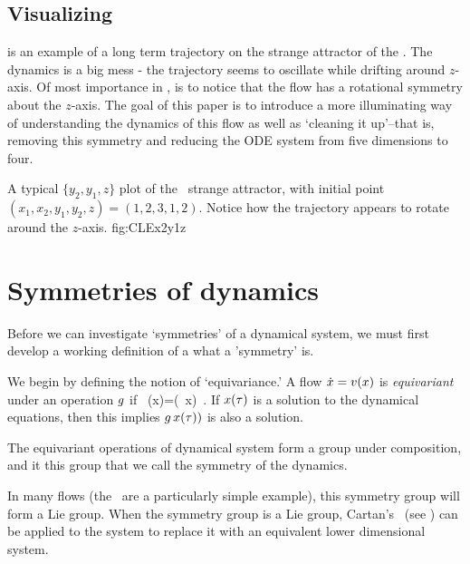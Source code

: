 {    \ifarticle
    \else

\subsection{Visualizing \cLf}

 is an example of a long term trajectory on the strange attractor of the \cLe. The dynamics is a big mess - the
trajectory seems to oscillate while drifting around $z$-axis.
Of most importance in , is to notice
that the flow has a rotational symmetry about the $z$-axis.
The goal of this paper is to introduce a more
illuminating way of understanding the dynamics of this flow
as well as `cleaning it up'--that is, removing this
symmetry and reducing the ODE system from five dimensions to
four.

    \fi

{}{
A typical $\{y_2,y_1,z\}$ plot of the \cLf\ strange attractor,
with initial point
$(x_1, x_2, y_1, y_2, z) = (1, 2, 3, 1, 2)$. Notice how the trajectory appears to rotate around the $z$-axis.
    }{fig:CLEx2y1z}

\section{Symmetries of dynamics}
\label{sect:SymmDyn}

Before we can investigate `symmetries' of a dynamical system, we must first develop a working definition of a what a 'symmetry' is.

We begin by defining the notion of `equivariance.'
A flow $\dot{x}= v(x)$ is \emph{equivariant} under an operation $g$ if
\beq
\LieEl \, \vel(x)=\vel(\LieEl \, x)
\,.
If $x(\tau)$ is a solution to the dynamical
equations, then this implies $g\,x(\tau))$ is also a solution.

The equivariant operations of dynamical system form a group under composition, and it this group that we call the symmetry of the dynamics.

In many flows (the \cLe\ are a particularly simple example),
this symmetry group will form a Lie group. When the symmetry group is a Lie group, Cartan's \mslices\ (see ) can be applied to the system to replace it with an equivalent lower dimensional system.


}

